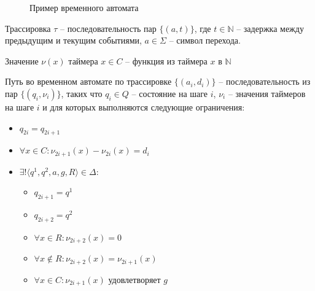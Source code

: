 \documentclass[times,specification,annotation]{itmo-student-thesis}
\begin{document}
\begin{figure}[!h]
\caption{Пример временного автомата}\label{time_automaton}
\centering
{}
\end{figure}

\begin{definition}
  Трассировка $\tau$ -- последовательность пар $\{\left( a, t \right)\}$, 
  где $t \in \mathbb{N}$ -- задержка между предыдущим и текущим событиями, $a \in \Sigma$ -- символ перехода.
\end{definition}

\begin{definition}
  Значение $\nu(x)$ таймера $x \in C$ -- функция из таймера $x$ в $\mathbb{N}$
\end{definition}

\begin{definition}
  Путь во временном автомате по трассировке $\{\left( a_i, d_i \right)\}$ -- последовательность из пар $\{\left( q_i, \nu_i \right)\}$, таких что $q_i \in Q$ -- состояние на шаге $i$, $\nu_i$ -- значения таймеров на шаге $i$
  и для которых выполняются следующие ограничения:
  \begin{itemize}
    \item $q_{2i} = q_{2i+1}$
    \item $\forall x \in C: \nu_{2i+1}(x) - \nu_{2i}(x) = d_i$
    \item $\exists! \langle q^1, q^2, a, g, R \rangle \in \Delta$: 
      \begin{itemize}
	\item $q_{2i+1} = q^1$
	\item $q_{2i+2} = q^2$
        \item $\forall x \in R: \nu_{2i+2}(x) = 0$
	\item $\forall x \not\in R: \nu_{2i+2}(x) = \nu_{2i+1}(x)$
	\item $\forall x \in C: \nu_{2i+1}(x)$ удовлетворяет $g$
      \end{itemize}
  \end{itemize}
\end{definition}
\end{document}
